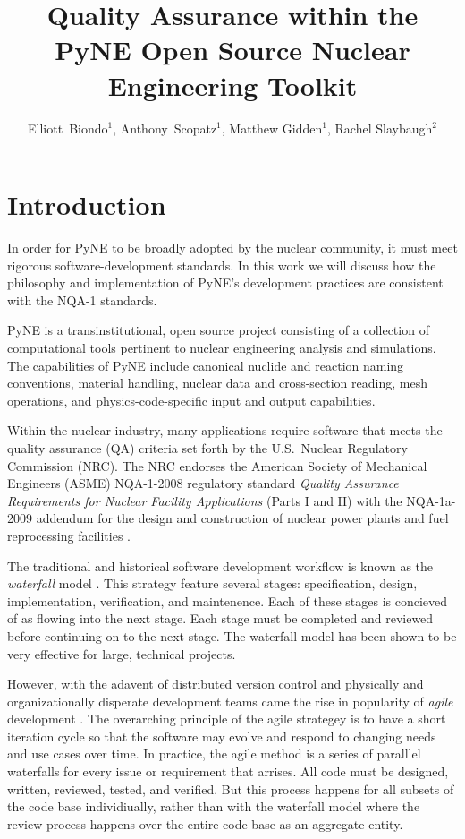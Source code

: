 \documentclass{anstrans}
\title{Quality Assurance within the PyNE Open Source Nuclear Engineering Toolkit}
\author{Elliott~Biondo$^{1}$, Anthony~Scopatz$^{1}$, Matthew Gidden$^{1}$, Rachel Slaybaugh$^{2}$}
\institute{
\and $^{1}$ The University of Wisconsin-Madison, 1500 Engineering Drive, Madison, WI 53706\\
\and $^{2}$ The University of California, Berkeley, 2521 Hearst Ave, Berkeley, CA 94709 \\
}
\begin{document}
\section{Introduction}

In order for PyNE \cite{scopatz_pyne} to be broadly adopted by the nuclear community, 
it must meet rigorous software-development standards.
In this work we will discuss how the philosophy and implementation 
of PyNE's development practices are consistent with the NQA-1 standards.

PyNE is a
transinstitutional, open source project consisting of a collection of
computational tools pertinent to nuclear engineering analysis and simulations.
The capabilities of PyNE include canonical nuclide and reaction naming
conventions, material handling, nuclear data and cross-section reading, mesh
operations, and physics-code-specific input and output capabilities. 

Within the nuclear industry, many applications require software that meets
the quality assurance (QA) criteria set forth by the U.S.\ Nuclear Regulatory
Commission (NRC). The NRC endorses the American Society of Mechanical Engineers
(ASME) NQA-1-2008 regulatory standard \emph{Quality Assurance Requirements for
Nuclear Facility Applications} (Parts I and II) \cite{nrc} with the NQA-1a-2009
addendum \cite{add} for the design and construction of nuclear power plants and
fuel reprocessing facilities \cite{nrc}. 

The traditional and historical software development workflow is known as the 
\emph{waterfall} model \cite{waterfall}. This strategy feature several stages:
specification, design, implementation, verification, and maintenence.  Each of
these stages is concieved of as flowing into the next stage.  Each stage must be 
completed and reviewed before continuing on to the next stage. The waterfall 
model has been shown to be very effective for large, technical projects.

However, with the adavent of distributed version control and physically 
and organizationally disperate development teams came the rise in popularity
of \emph{agile} development \cite{larman2004agile}. The overarching principle 
of the agile strategey is to have a short iteration cycle so that the software
may evolve and respond to changing needs and use cases over time.
In practice, the agile method is a series of paralllel waterfalls for every issue
or requirement that arrises. All code must be designed, written, reviewed, 
tested, and verified. But this process happens for all subsets of the code base
individiually, rather than with the waterfall model where the review 
process happens over the entire code base as an aggregate entity.
\end{document}
